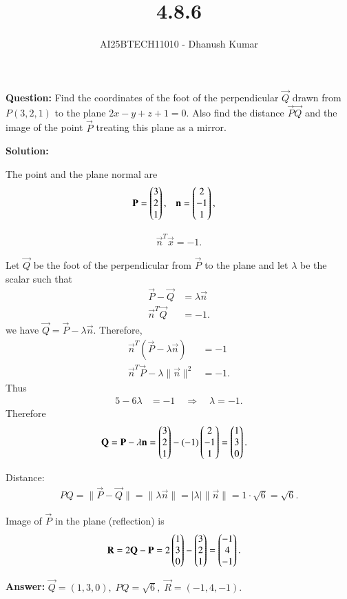 \documentclass[journal]{IEEEtran}
\begin{document}
\title{4.8.6}
\author{AI25BTECH11010 - Dhanush Kumar}
\maketitle
\renewcommand{\thefigure}{\theenumi}
\renewcommand{\thetable}{\theenumi}

\noindent\textbf{Question:}
Find the coordinates of the foot of the perpendicular $\vec{Q}$ drawn from $P(3,2,1)$ to the
plane $2x - y + z + 1 = 0$. Also find the distance $\vec{P}\vec{Q}$ and the image of the point $\vec{P}$
treating this plane as a mirror.
\medskip

\noindent\textbf{Solution:}

The point and the plane normal are
\begin{align}
\mathbf{P} &= \begin{pmatrix}3\\2\\1\end{pmatrix}, & \mathbf{n} &= \begin{pmatrix}2\\-1\\1\end{pmatrix},
\end{align}

\begin{align}
\vec{n}^T\vec{x} = -1.
\end{align}

Let $\vec{Q}$ be the foot of the perpendicular from $\vec{P}$ to the plane and let $\lambda$ be the scalar such that
\begin{align}
\vec{P}-\vec{Q} &= \lambda\vec{n}\\
\vec{n}^T\vec{Q} &= -1. 
\end{align}
 we have $\vec{Q}=\vec{P}-\lambda\vec{n}$.
 Therefore,
\begin{align}
\vec{n}^T(\vec{P}-\lambda\vec{n}) &= -1 \\
\vec{n}^T\vec{P} - \lambda\|\vec{n}\|^2 &= -1.
\end{align}
Thus
\begin{align}
5 - 6\lambda &= -1 \quad\Rightarrow\quad \lambda = -1.
\end{align}
Therefore
\begin{align}
\mathbf{Q} &= \mathbf{P}-\lambda\mathbf{n} = \begin{pmatrix}3\\2\\1\end{pmatrix} - (-1)\begin{pmatrix}2\\-1\\1\end{pmatrix}
= \begin{pmatrix}1\\3\\0\end{pmatrix}.
\end{align}

Distance:
\begin{align}
PQ = \|\vec{P}-\vec{Q}\| = \|\lambda\vec{n}\| = |\lambda|\|\vec{n}\| = 1\cdot\sqrt{6}=\sqrt{6}.
\end{align}

Image of $\vec{P}$ in the plane (reflection) is
\begin{align}
\mathbf{R} &= 2\mathbf{Q} - \mathbf{P} = 2\begin{pmatrix}1\\3\\0\end{pmatrix} - \begin{pmatrix}3\\2\\1\end{pmatrix} = \begin{pmatrix}-1\\4\\-1\end{pmatrix}.
\end{align}

\bigskip
\noindent\textbf{Answer:} \(
\vec{Q}=(1,3,0),\; PQ=\sqrt{6},\; \vec{R}=(-1,4,-1).
\)
\end{document}
